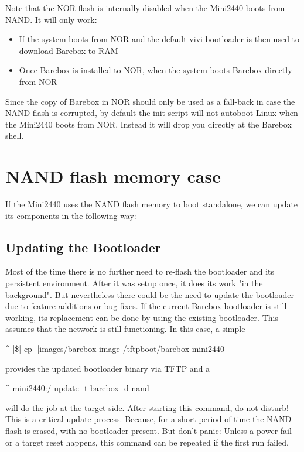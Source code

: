 Note that the NOR flash is internally disabled when the Mini2440 boots from
NAND. It will only work:

\begin{itemize}
	\item If the system boots from NOR and the default vivi bootloader is then
	used to download Barebox to RAM
	\item Once Barebox is installed to NOR, when the system boots Barebox
	directly from NOR
\end{itemize}

Since the copy of Barebox in NOR should only be used as a fall-back in case the
NAND flash is corrupted, by default the init script will not autoboot Linux
when the Mini2440 boots from NOR. Instead it will drop you directly at the
Barebox shell.

\section{NAND flash memory case}

If the Mini2440 uses the NAND flash memory to boot standalone, we can update
its components in the following way:

\subsection{Updating the Bootloader}

Most of the time there is no further need to re-flash the bootloader and its
persistent environment. After it was setup once, it does its work "in the
background". But nevertheless there could be the need to update the bootloader
due to feature additions or bug fixes. If the current Barebox bootloader is
still working, its replacement can be done by using the existing bootloader.
This assumes that the network is still functioning. In this case, a simple

\begin{ptxshell}[escapechar=|]{^}
|\$| cp |\ptxdistPlatformDir |images/barebox-image /tftpboot/barebox-mini2440
\end{ptxshell}

provides the updated bootloader binary via TFTP and a

\begin{ptxshell}[escapechar=|]{^}
mini2440:/ update -t barebox -d nand
\end{ptxshell}

will do the job at the target side. After starting this command, do not disturb!
This is a critical update process. Because, for a short period of time the
NAND flash is erased, with no bootloader present. But don't panic: Unless a
power fail or a target reset happens, this command can be repeated if the
first run failed.

